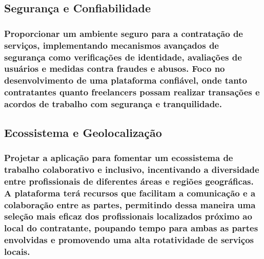 \subsection{Segurança e Confiabilidade}
\subsubsection{Proporcionar um ambiente seguro para a contratação de serviços, implementando mecanismos avançados de segurança como verificações de identidade, avaliações de usuários e medidas contra fraudes e abusos. Foco no desenvolvimento de uma plataforma confiável, onde tanto contratantes quanto freelancers possam realizar transações e acordos de trabalho com segurança e tranquilidade.}

\subsection{Ecossistema e Geolocalização} 
\subsubsection{Projetar a aplicação para fomentar um ecossistema de trabalho colaborativo e inclusivo, incentivando a diversidade entre profissionais de diferentes áreas e regiões geográficas. A plataforma terá recursos que facilitam a comunicação e a colaboração entre as partes, permitindo dessa maneira uma seleção mais eficaz dos profissionais localizados próximo ao local do contratante, poupando tempo para ambas as partes envolvidas e promovendo uma alta rotatividade de serviços locais.}
